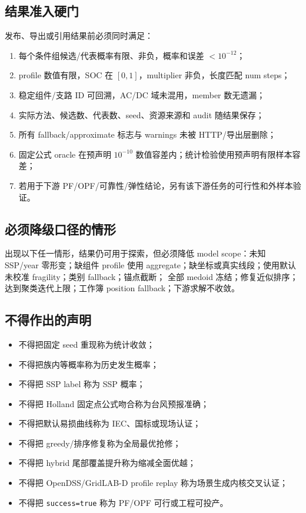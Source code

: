\subsection{结果准入硬门}
发布、导出或引用结果前必须同时满足：
\begin{enumerate}
  \item 每个条件组候选/代表概率有限、非负，概率和误差 $<10^{-12}$；
  \item profile 数值有限，SOC 在 $[0,1]$，multiplier 非负，长度匹配 num steps；
  \item 稳定组件/支路 ID 可回溯，AC/DC 域未混用，member 数无遗漏；
  \item 实际方法、候选数、代表数、seed、资源来源和 audit 随结果保存；
  \item 所有 fallback/approximate 标志与 warnings 未被 HTTP/导出层删除；
  \item 固定公式 oracle 在预声明 $10^{-10}$ 数值容差内；统计检验使用预声明有限样本容差；
  \item 若用于下游 PF/OPF/可靠性/弹性结论，另有该下游任务的可行性和外样本验证。
\end{enumerate}

\subsection{必须降级口径的情形}
出现以下任一情形，结果仍可用于探索，但必须降低 model scope：未知 SSP/year 零形变；缺组件
profile 使用 aggregate；缺坐标或真实线段；使用默认未校准 fragility；类别 fallback；锚点截断；
全部 medoid 冻结；修复近似排序；达到聚类迭代上限；工作簿 position fallback；下游求解不收敛。

\subsection{不得作出的声明}
\begin{itemize}
  \item 不得把固定 seed 重现称为统计收敛；
  \item 不得把族内等概率称为历史发生概率；
  \item 不得把 SSP label 称为 SSP 概率；
  \item 不得把 Holland 固定点公式吻合称为台风预报准确；
  \item 不得把默认易损曲线称为 IEC、国标或现场认证；
  \item 不得把 greedy/排序修复称为全局最优抢修；
  \item 不得把 hybrid 尾部覆盖提升称为缩减全面优越；
  \item 不得把 OpenDSS/GridLAB-D profile replay 称为场景生成内核交叉认证；
  \item 不得把 \texttt{success=true} 称为 PF/OPF 可行或工程可投产。
\end{itemize}

